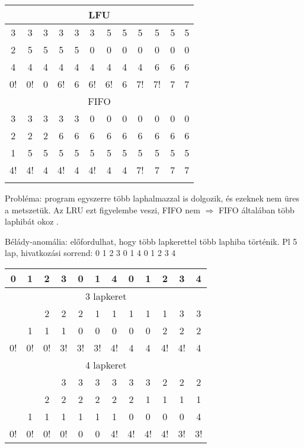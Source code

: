 \documentclass[fleqn,10pt,a4paper]{article}
\newcommand{\nn}{\Rightarrow}
\theoremstyle{magyar}
\begin{document}
  \begin{tabular}{@{}cccccccccccc@{}}\toprule
    \multicolumn{12}{c}{LFU}\\\midrule
    3 & 3 & 3 & 3 & 3 & 3 & 5 & 5 & 5 & 5 & 5 & 5\\
    2 & 5 & 5 & 5 & 5 & 0 & 0 & 0 & 0 & 0 & 0 & 0\\
    4 & 4 & 4 & 4 & 4 & 4 & 4 & 4 & 4 & 6 & 6 & 6\\
    0!& 0!& 0 & 6!& 6 & 6!& 6!& 6 & 7!& 7!& 7 & 7\\\midrule
    \multicolumn{12}{c}{FIFO}\\\midrule
    3 & 3 & 3 & 3 & 3 & 0 & 0 & 0 & 0 & 0 & 0 & 0\\
    2 & 2 & 2 & 6 & 6 & 6 & 6 & 6 & 6 & 6 & 6 & 6\\
    1 & 5 & 5 & 5 & 5 & 5 & 5 & 5 & 5 & 5 & 5 & 5\\
    4!& 4!& 4 & 4!& 4 & 4!& 4 & 4 & 7!& 7 & 7 & 7\\\bottomrule\\
  \end{tabular}
  

  Probléma: program egyszerre több laphalmazzal is dolgozik, és ezeknek nem üres a metszetük. Az LRU ezt figyelembe
  veszi, FIFO nem $\nn$ FIFO általában több laphibát okoz .
  
  Bélády-anomália: előfordulhat, hogy több lapkerettel több laphiba történik. Pl 5 lap, hivatkozási sorrend: 0 1 2 3 0 1 4 0 1 2 3 4\\
  
  \begin{tabular}{@{}cccccccccccc@{}}\toprule
    0 & 1 & 2 & 3 & 0 & 1 & 4 & 0 & 1 & 2 & 3 & 4\\\midrule
    \multicolumn{12}{c}{3 lapkeret}\\\midrule
    &   & 2 & 2 & 2 & 1 & 1 & 1 & 1 & 1 & 3 & 3\\
    & 1 & 1 & 1 & 0 & 0 & 0 & 0 & 0 & 2 & 2 & 2\\
    0!& 0!& 0!& 3!& 3!& 3!& 4!& 4 & 4 & 4!& 4!& 4\\\midrule
    \multicolumn{12}{c}{4 lapkeret}\\\midrule
    &   &   & 3 & 3 & 3 & 3 & 3 & 3 & 2 & 2 & 2\\
    &   & 2 & 2 & 2 & 2 & 2 & 2 & 1 & 1 & 1 & 1\\
    & 1 & 1 & 1 & 1 & 1 & 1 & 0 & 0 & 0 & 0 & 4\\
    0!& 0!& 0!& 0!& 0 & 0 & 4!& 4!& 4!& 4!& 3!& 3!\\\bottomrule
  \end{tabular}
\end{document}
